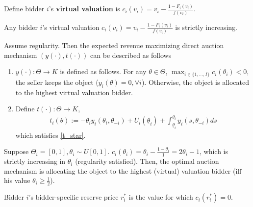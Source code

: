 \documentclass[11pt]{elegantbook_2}
\begin{document}
\begin{definition}
    Define bidder $i$'s \textbf{virtual valuation} is $c_i(v_i)=v_i-\frac{1-F_i(v_i)}{f(v_i)}$.
\end{definition}

\begin{assumption}
    Any bidder $i$'s virtual valuation $c_i(v_i)=v_i-\frac{1-F_i(v_i)}{f(v_i)}$ is strictly increasing.
\end{assumption}

\begin{corollary}
    Assume regularity. Then the expected revenue maximizing direct auction mechanism $(y(\cdot),t(\cdot))$ can be described as follows
    \begin{enumerate}[(1).]
        \item $y(\cdot): \Theta \rightarrow K$ is defined as follows. For any $\theta\in \Theta$, $\max_{i\in\{1,...,I\}}c_i(\theta_i)<0$, the seller keeps the object ($y_i(\theta)=0,\forall  i$). Otherwise, the object is allocated to the highest virtual valuation bidder.
        \item Define $t(\cdot):\Theta \rightarrow K$,
        \begin{equation}
            \begin{aligned}
                t_i(\theta):=-\theta_i y_i(\theta_i,\theta_{-i})+U_i(\underline{\theta}_i)+\int_{\underline{\theta}_i}^{\theta_i}y_i(s,\theta_{-i})ds
            \end{aligned}
            \nonumber
        \end{equation}
        which satisfies \eqref{t_star}.
    \end{enumerate}
\end{corollary}

\begin{example}
    Suppose $\Theta_i=[0,1],\theta_i\sim U[0,1]$. $c_i(\theta_i)=\theta_i-\frac{1-\theta_i}{1}=2\theta_i-1$, which is strictly increasing in $\theta_i$ (regularity satisfied). Then, the optimal auction mechanism is allocating the object to the highest (virtual) valuation bidder (iff his value $\theta_i\geq\frac{1}{2}$).
\end{example}

\begin{definition}
    Bidder $i$'s bidder-specific reserve price $r_i^*$ is the value for which $c_i(r_i^*)=0$.
\end{definition}
\end{document}

